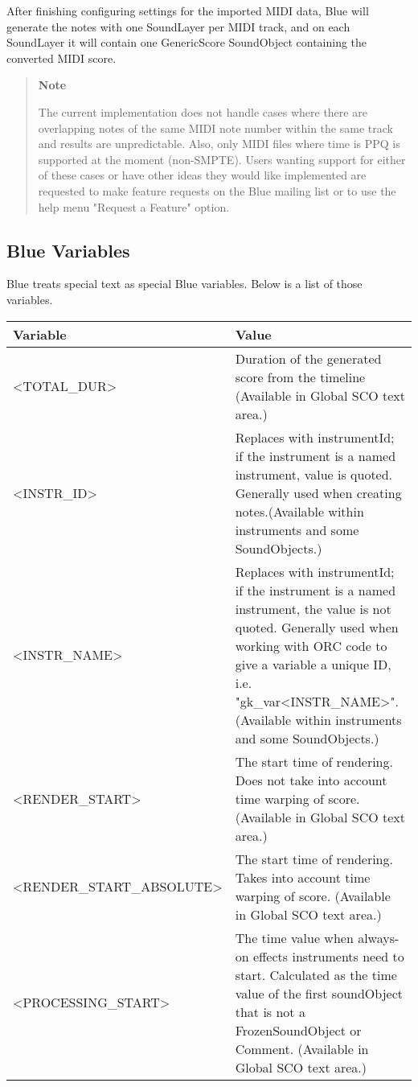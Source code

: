 After finishing configuring settings for the imported MIDI data, Blue
will generate the notes with one SoundLayer per MIDI track, and on each
SoundLayer it will contain one GenericScore SoundObject containing the
converted MIDI score.

\begin{quote}
\textbf{Note}

The current implementation does not handle cases where there are
overlapping notes of the same MIDI note number within the same track and
results are unpredictable. Also, only MIDI files where time is PPQ is
supported at the moment (non-SMPTE). Users wanting support for either of
these cases or have other ideas they would like implemented are
requested to make feature requests on the Blue mailing list or to use
the help menu "Request a Feature" option.
\end{quote}

\subsection{Blue Variables}\label{blueVariables}

Blue treats special text as special Blue variables. Below is a list of
those variables.

\begin{longtable}[]{@{}ll@{}}
\toprule
Variable & Value\tabularnewline
\midrule
\endhead
\textless{}TOTAL\_DUR\textgreater{} & Duration of the generated score
from the timeline (Available in Global SCO text area.)\tabularnewline
\textless{}INSTR\_ID\textgreater{} & Replaces with instrumentId; if the
instrument is a named instrument, value is quoted. Generally used when
creating notes.(Available within instruments and some
SoundObjects.)\tabularnewline
\textless{}INSTR\_NAME\textgreater{} & Replaces with instrumentId; if
the instrument is a named instrument, the value is not quoted. Generally
used when working with ORC code to give a variable a unique ID, i.e.
"gk\_var\textless{}INSTR\_NAME\textgreater{}".(Available within
instruments and some SoundObjects.)\tabularnewline
\textless{}RENDER\_START\textgreater{} & The start time of rendering.
Does not take into account time warping of score. (Available in Global
SCO text area.)\tabularnewline
\textless{}RENDER\_START\_ABSOLUTE\textgreater{} & The start time of
rendering. Takes into account time warping of score. (Available in
Global SCO text area.)\tabularnewline
\textless{}PROCESSING\_START\textgreater{} & The time value when
always-on effects instruments need to start. Calculated as the time
value of the first soundObject that is not a FrozenSoundObject or
Comment. (Available in Global SCO text area.)\tabularnewline
\bottomrule
\end{longtable}

